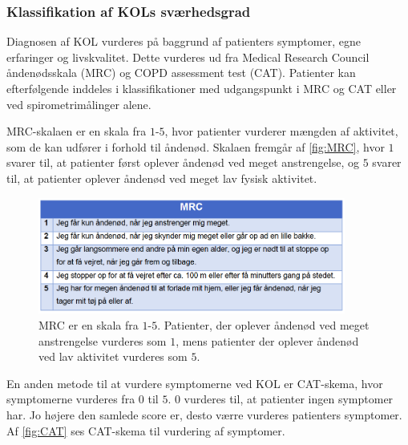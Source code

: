 \subsubsection{Klassifikation af KOLs sværhedsgrad}
Diagnosen af KOL vurderes på baggrund af patienters symptomer, egne erfaringer og livskvalitet. Dette vurderes ud fra Medical Research Council åndenødsskala (MRC) og COPD assessment test (CAT). Patienter kan efterfølgende inddeles i klassifikationer med udgangspunkt i MRC og CAT eller ved spirometrimålinger alene.\cite{Basisbogen2016}

 
MRC-skalaen er en skala fra $1$-$5$, hvor patienter vurderer mængden af aktivitet, som de kan udfører i forhold til åndenød. Skalaen fremgår af \autoref{fig:MRC}, hvor $1$ svarer til, at patienter først oplever åndenød ved meget anstrengelse, og $5$ svarer til, at patienter oplever åndenød ved meget lav fysisk aktivitet. \cite{Basisbogen2016}

\begin{figure} [H]
\centering
\includegraphics[width=0.9\textwidth]{figures/MRC}
\caption{MRC er en skala fra $1$-$5$. Patienter, der oplever åndenød ved meget anstrengelse vurderes som $1$, mens patienter der oplever åndenød ved lav aktivitet vurderes som $5$.}
\label{fig:MRC}
\end{figure} 

\noindent
En anden metode til at vurdere symptomerne ved KOL er  CAT-skema, hvor symptomerne vurderes fra $0$ til $5$. $0$ vurderes til, at patienter ingen symptomer har. Jo højere den samlede score er, desto værre vurderes patienters symptomer. Af \autoref{fig:CAT} ses CAT-skema til vurdering af symptomer.\cite{Basisbogen2016, dsam2016}

